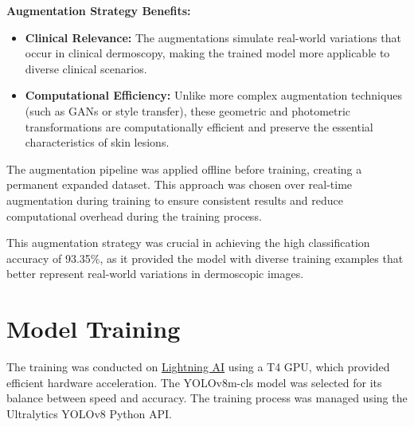 \documentclass[a4paper,12pt]{report}
\begin{document}
\begin{spacing}{1.5}
    \textbf{Augmentation Strategy Benefits:}
    \begin{itemize}
        
        \item \textbf{Clinical Relevance:} The augmentations simulate real-world variations that occur in clinical dermoscopy, making the trained model more applicable to diverse clinical scenarios.
        
        \item \textbf{Computational Efficiency:} Unlike more complex augmentation techniques (such as GANs or style transfer), these geometric and photometric transformations are computationally efficient and preserve the essential characteristics of skin lesions.
    \end{itemize}
    
    The augmentation pipeline was applied offline before training, creating a permanent expanded dataset. This approach was chosen over real-time augmentation during training to ensure consistent results and reduce computational overhead during the training process.
    
    This augmentation strategy was crucial in achieving the high classification accuracy of 93.35\%, as it provided the model with diverse training examples that better represent real-world variations in dermoscopic images.

    \section{Model Training}
    The training was conducted on \href{https://lightning.ai/}{Lightning AI} using a T4 GPU, which provided efficient hardware acceleration. The YOLOv8m-cls model was selected for its balance between speed and accuracy. The training process was managed using the Ultralytics YOLOv8 Python API.
    

\end{spacing}
\end{document}
